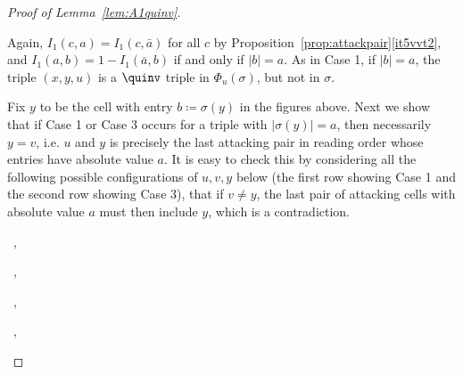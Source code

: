 \begin{proof}[Proof of Lemma~\ref{lem:A1quinv}]
\begin{flushleft}
\end{flushleft}
Again, $I_1(c,a)=I_1(c,\bar{a})$ for all $c$ by Proposition~\ref{prop:attackpair}\ref{it5vvt2}, and $I_1(a,b)=1-I_1(\bar{a},b)$ if and only if $|b|=a$. As in Case 1, if $|b|=a$, the triple $(x,y,u)$ is a $\quinv$ triple in $\Phi_u(\sigma)$, but not in $\sigma$.

Fix $y$ to be the cell with entry $b\coloneqq\sigma(y)$ in the figures above. Next we show that if Case 1 or Case 3 occurs for a triple with $|\sigma(y)|=a$, then necessarily $y=v$, i.e. $u$ and $y$ is precisely the last attacking pair in reading order whose entries have absolute value $a$. It is easy to check this by considering all the following possible configurations of $u,v,y$ below (the first row showing Case 1 and the second row showing Case 3), that if $v\neq y$, the last pair of attacking cells with absolute value $a$ must then include $y$, which is a contradiction.

\begin{center}
\ ,
\quad
{}\ ,
\quad
{}\ ,
\quad
{}
\quad
{}\ ,
\quad
{}
\end{center}


\end{proof}
